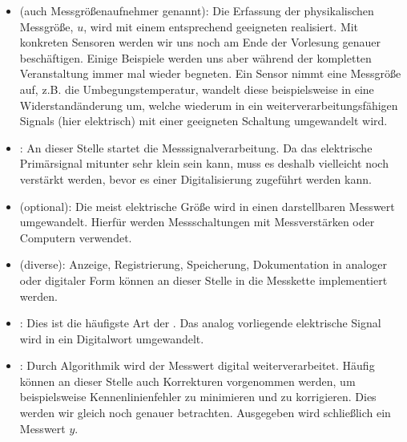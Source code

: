 \documentclass[letterpaper,10pt,english]{jupyterBook}
\begin{document}
\begin{itemize}
\item {} 
\sphinxAtStartPar
{} (auch Messgrößenaufnehmer genannt): Die Erfassung der physikalischen Messgröße, \(u\), wird mit einem entsprechend geeigneten  realisiert. Mit konkreten Sensoren werden wir uns noch am Ende der Vorlesung genauer beschäftigen. Einige Beispiele werden uns aber während der kompletten Veranstaltung immer mal wieder begneten. Ein Sensor nimmt eine Messgröße auf, z.B. die Umbegungstemperatur, wandelt diese beispielsweise in eine Widerstandänderung um, welche wiederum in ein weiterverarbeitungsfähigen Signals (hier elektrisch) mit einer geeigneten Schaltung umgewandelt wird.

\item {} 
\sphinxAtStartPar
{}: An dieser Stelle startet die Messsignalverarbeitung. Da das elektrische Primärsignal mitunter sehr  klein sein kann, muss es deshalb vielleicht noch verstärkt werden, bevor es einer Digitalisierung zugeführt werden kann.

\item {} 
\sphinxAtStartPar
{} (optional): Die meist elektrische Größe wird in einen darstellbaren Messwert umgewandelt. Hierfür werden Messschaltungen mit Messverstärken oder Computern verwendet.

\item {} 
\sphinxAtStartPar
{} (diverse): Anzeige, Registrierung, Speicherung, Dokumentation in analoger oder digitaler Form können an dieser Stelle in die Messkette implementiert werden.

\item {} 
\sphinxAtStartPar
{}: Dies ist die häufigste Art der . Das analog vorliegende elektrische Signal wird in ein Digitalwort umgewandelt.

\item {} 
\sphinxAtStartPar
{}: Durch Algorithmik wird der Messwert digital weiterverarbeitet. Häufig können an dieser Stelle auch Korrekturen vorgenommen werden, um beispielsweise Kennenlinienfehler zu minimieren und zu korrigieren. Dies werden wir gleich noch genauer betrachten. Ausgegeben wird schließlich ein Messwert \(y\).

\end{itemize}
\end{document}
